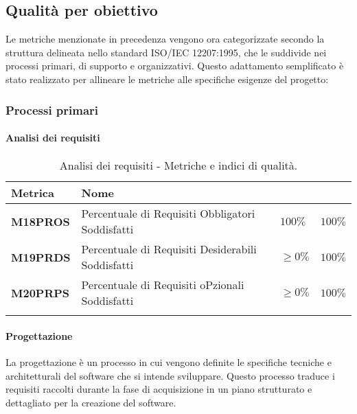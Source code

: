 \subsection{Qualità per obiettivo}
Le metriche menzionate in precedenza vengono ora categorizzate secondo la struttura delineata nello standard ISO/IEC 12207:1995, che le suddivide nei processi primari, di supporto e organizzativi. Questo adattamento semplificato è stato realizzato per allineare le metriche alle specifiche esigenze del progetto:

\subsubsection{Processi primari}
\paragraph{Analisi dei requisiti}
\hspace{1pt}
    \begin{longtable}{|C{1.5cm}|L{3cm}|L{2.5cm}|L{2.5cm}|}
        \hline
        \textbf{Metrica} & \textbf{Nome} & \textbf{} & \textbf{} \\
        \hline\textbf{M18PROS} & Percentuale di Requisiti Obbligatori Soddisfatti & $ 100\%$  & $ 100\%$ \\
        \hline
        \textbf{M19PRDS} & Percentuale di Requisiti Desiderabili Soddisfatti & $\geq 0\%$ & $100\%$ \\
        \hline
        \textbf{M20PRPS} & Percentuale di Requisiti oPzionali Soddisfatti & $\geq 0\%$ & $100\%$ \\
        \hline
    \caption{Analisi dei requisiti - Metriche e indici di qualità.}
    \label{tab:analisi_requisiti_progetto}
\end{longtable}

\paragraph{Progettazione}
La progettazione è un processo in cui vengono definite le specifiche tecniche e architetturali del software che si intende sviluppare. Questo processo traduce i requisiti raccolti durante la fase di acquisizione in un piano strutturato e dettagliato per la creazione del software.

